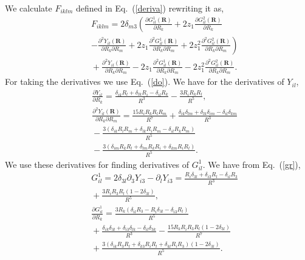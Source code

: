 We calculate $F_{iklm}$ defined in Eq.~(\ref{deriva}) rewriting it as,
\begin{eqnarray}&&\!\!\!\!\!\!\!\!\!\!
F_{iklm}=2\delta_{m3}\left(\frac{\partial G^1_{il}(\bm R)}{\partial R_k}+2z_1\frac{\partial G^2_{il}(\bm R)}{\partial R_k}
\right.\nonumber\\&&\!\!\!\!\!\!\!\!\!\!\left.
-\frac{\partial^2 Y_{il}(\bm R)}{\partial R_k \partial R_m}\!+\!2z_1\frac{\partial^2 G^1_{il}(\bm R)}{\partial R_k \partial R_m}
\!+\!2z_1^2\frac{\partial^2 G^2_{il}(\bm R)}{\partial R_k \partial R_m}\right)\nonumber\\&&\!\!\!\!\!\!\!\!\!\!
+\frac{\partial^2 Y_{il}(\bm R)}{\partial R_k \partial R_m}\!-\!2z_1\frac{\partial^2 G^1_{il}(\bm R)}{\partial R_k \partial R_m}
\!-\!2z_1^2\frac{\partial^2 G^2_{il}(\bm R)}{\partial R_k \partial R_m}.\label{tensor}
\end{eqnarray}
For taking the derivatives we use Eq.~(\ref{do}). We have for the derivatives of $Y_{il}$, %
\begin{eqnarray}&&\!\!\!\!\!\!\!\!\!\!\!\!\!\!\!\!
\frac{\partial Y_{il}}{\partial R_k}=\frac{\delta_{ik}R_l+\delta_{lk}R_i-\delta_{il}R_k}{R^3}-\frac{3R_iR_kR_l}{R^5},\nonumber\\&&\!\!\!\!\!\!\!\!\!\!\!\!\!\!\!\!
\frac{\partial^2 Y_{il}(\bm R)}{\partial R_k \partial R_m}=\frac{15R_iR_kR_lR_m}{R^7}+\frac{\delta_{ik}\delta_{lm}+\delta_{lk}\delta_{im}-\delta_{il}\delta_{km}}{R^3}
\nonumber\\&&\!\!\!\!\!\!\!\!\!\!\!\!\!\!\!\!
-\frac{3\left(\delta_{ik}R_lR_m+\delta_{lk}R_iR_m-\delta_{il}R_kR_m\right)}{R^5}
\nonumber\\&&\!\!\!\!\!\!\!\!\!\!\!\!\!\!\!\!
-\frac{3\left(\delta_{im}R_kR_l+\delta_{lm}R_kR_i+\delta_{km}R_iR_l\right)}{R^5}.
\end{eqnarray}
We use these derivatives for finding derivatives of $G^1_{il}$. We have from Eq.~(\ref{gr}),
\begin{eqnarray}&&\!\!\!\!\!\!\!\!\!\!\!\!\!\!\!\!
G^1_{il}\!=\!2\delta_{3l}\partial_3 Y_{i3}-\partial_l Y_{i3} =
\frac{R_i\delta_{3l}+\delta_{i3}R_l-\delta_{il}R_3}{R^3}\nonumber\\&&\!\!\!\!\!\!\!\!\!\!\!\!\!\!\!\!
+\frac{3R_iR_3R_l\left(1-2\delta_{3l}\right)}{R^5},
\nonumber\\&&\!\!\!\!\!\!\!\!\!\!\!\!\!\!\!\!
\frac{\partial G^1_{il}}{\partial R_k}\!=\!\frac{3R_k\left(\delta_{il}R_3-R_i\delta_{3l}\!-\!\delta_{i3}R_l\right)}{R^5}
\nonumber\\&&\!\!\!\!\!\!\!\!\!\!\!\!\!\!\!\!
+\frac{\delta_{ik}\delta_{3l}\!+\!\delta_{i3}\delta_{lk}\!-\!\delta_{il}\delta_{3k}}{R^3}
-\frac{15R_kR_iR_3R_l\left(1-2\delta_{3l}\right)}{R^7}\nonumber\\&&\!\!\!\!\!\!\!\!\!\!\!\!\!\!\!\!
+\frac{3\left(\delta_{ik}R_3R_l+\delta_{k3}R_iR_l+\delta_{kl}R_iR_3\right)\left(1-2\delta_{3l}\right)}{R^5}.
\end{eqnarray}
